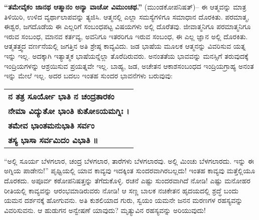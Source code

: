 \textbf{“ತಮೇವೈಕಂ ಜಾನಥ ಆತ್ಮಾನಂ ಅನ್ಯಾ ವಾಚೋ ವಿಮುಂಚಥ.”} (ಮುಂಡಕೋಪ\break ನಿಷತ್​)– ಈ ಆತ್ಮವನ್ನು ಮಾತ್ರ ತಿಳಿಯಿರಿ, ಉಳಿದ ವ್ಯರ್ಥಾಲಾಪವನ್ನು ತ್ಯಜಿಸಿ. ಆತ್ಮನಲ್ಲಿ ಎಲ್ಲಾ ಸಮಸ್ಯೆಗಳಿಗೂ ಸಮಾಧಾನ ದೊರಕಿತು. ಪರಮಾತ್ಮ, ಈಶ್ವರ, ಜಗದೊಡೆಯ ಈ ಎಲ್ಲರಿಗೆ ಸಂಬಂಧಪಟ್ಟ ವಿಷಯಗಳು ಅಲ್ಲಿ ದೊರೆತವು. ಜೀವಾತ್ಮನಿಗೂ ಪರಮಾತ್ಮನಿಗೂ ಇರುವ ಸಂಬಂಧ, ಮಾನವ ಕರ್ತವ್ಯ, ಅವನಿಗೂ ಇತರರಿಗೂ ಇರುವ ಸಂಬಂಧ, ಈ ಎಲ್ಲ ಜ್ಞಾನ ಅಲ್ಲಿ ದೊರಕಿತು. ಆತ್ಮತತ್ತ್ವದ ವರ್ಣನೆಯಲ್ಲಿ ಜಗತ್ತಿನ ಅತಿ ಶ್ರೇಷ್ಠ ಕಾವ್ಯವಿದು. ಜಡ ಭಾಷೆಯ ಮೂಲಕ ಆತ್ಮನನ್ನು ವಿವರಿಸುವ ಯತ್ನ ಇನ್ನು ಇಲ್ಲ. ಅದಕ್ಕಾಗಿ ಇತ್ಯಾತ್ಮಕ\break {} ಭಾಷೆಯನ್ನೆಲ್ಲಾ ತೊರೆದಿರುವರು. ಅನಂತತೆಯ ಭಾವವನ್ನು ಮನಸ್ಸಿಗೆ ತರುವುದಕ್ಕೆ ಇಂದ್ರಿಯಗಳನ್ನು ಆಶ್ರಯಿಸುವ ಪ್ರಯತ್ನವೇ ಇಲ್ಲ. ಬಾಹ್ಯ, ಜಡ, ಅಚೇತನ ಆಕಾಶಸಂಬಂಧದ ಇಂದ್ರಿಯಗ್ರಾಹ್ಯ ಅನಂತ ಇನ್ನು ಮೇಲೆ ಇಲ್ಲ. ಅದರ ಬದಲು ಇಂತಹ ಸುಂದರ ಭಾವನೆಗಳು ಬರುವುವು:

\begin{longtable}[r]{@{}l@{}}
\textbf{ನ ತತ್ರ ಸೂರ್ಯೋ ಭಾತಿ ನ ಚಂದ್ರತಾರಕಂ} \\
\textbf{ನೇಮಾ ವಿದ್ಯುತೋ ಭಾಂತಿ ಕುತೋಽಯಮಗ್ನಿಃ ।} \\
\textbf{ತಮೇವ ಭಾಂತಮನುಭಾತಿ ಸರ್ವಂ} \\
\textbf{ತಸ್ಯ ಭಾಸಾ ಸರ್ವಮಿದಂ ವಿಭಾತಿ ॥} \\
\end{longtable}

“ಅಲ್ಲಿ ಸೂರ್ಯ ಬೆಳಗಲಾರ, ಚಂದ್ರ ಬೆಳಗಲಾರ, ತಾರೆಗಳು ಬೆಳಗಲಾರವು. ಅಲ್ಲಿ ಮಿಂಚು ಬೆಳಗಲಾರದು. ಇನ್ನು ಈ ಅಗ್ನಿಯ ಪಾಡೇನು!” ಪೃಥ್ವಿಯಲ್ಲಿ ಯಾವ ಕಾವ್ಯವು ಇದಕ್ಕಿಂತ ಸುಂದರವಾಗಿರಬಲ್ಲದು! ಇಂತಹ ಕಾವ್ಯವು ಮತ್ತೆಲ್ಲಿಯೂ ದೊರಕದು. ಅಪೂರ್ವ ಕಠೋಪನಿಷತ್ತನ್ನು ತೆಗೆದುಕೊಳ್ಳಿ. ರಚನೆ ಎಷ್ಟು ಸುಂದರವಾಗಿದೆ ನೋಡಿ! ಎಷ್ಟು ಮನೋಹರ ರೀತಿಯಲ್ಲಿ ಕಾವ್ಯವನ್ನು ಆರಂಭಮಾಡಿರುವರು ನೋಡಿ! ಆ ಸಣ್ಣ ಬಾಲಕ ನಚಿಕೇತನ ಹೃದಯದಲ್ಲಿ ಶ್ರದ್ಧೆ ಬಂದು ಯಮನ ದರ್ಶನಕ್ಕೆ ಹೋಗುವನು. ಅತಿ ಕುಶಲಿಯಾದ ಗುರು, ಸ್ವಯಂ ಯಮನೇ ಜನನ ಮರಣಗಳ ರಹಸ್ಯವನ್ನು ವಿವರಿಸುವನು. ಆ ಹುಡುಗನ ಅನ್ವೇಷಣೆ ಯಾವುದು? ಮೃತ್ಯುವಿನ ರಹಸ್ಯವನ್ನು ಅರಿಯುವುದು!

